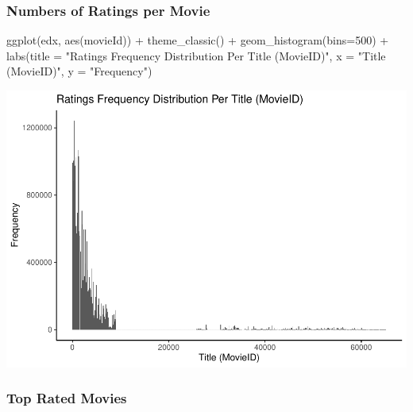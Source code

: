 \documentclass[
]{article}
\newenvironment{Shaded}{}{}
\newcommand{\AttributeTok}[1]{\textcolor[rgb]{0.49,0.56,0.16}{#1}}
\newcommand{\DecValTok}[1]{\textcolor[rgb]{0.25,0.63,0.44}{#1}}
\newcommand{\FunctionTok}[1]{\textcolor[rgb]{0.02,0.16,0.49}{#1}}
\newcommand{\NormalTok}[1]{#1}
\newcommand{\SpecialCharTok}[1]{\textcolor[rgb]{0.25,0.44,0.63}{#1}}
\newcommand{\StringTok}[1]{\textcolor[rgb]{0.25,0.44,0.63}{#1}}
\begin{document}
\hypertarget{numbers-of-ratings-per-movie}{%
\subsubsection{Numbers of Ratings per
Movie}\label{numbers-of-ratings-per-movie}}

\begin{Shaded}
\begin{Highlighting}[]
   \FunctionTok{ggplot}\NormalTok{(edx, }\FunctionTok{aes}\NormalTok{(movieId)) }\SpecialCharTok{+}
   \FunctionTok{theme\_classic}\NormalTok{()  }\SpecialCharTok{+}
   \FunctionTok{geom\_histogram}\NormalTok{(}\AttributeTok{bins=}\DecValTok{500}\NormalTok{) }\SpecialCharTok{+}
   \FunctionTok{labs}\NormalTok{(}\AttributeTok{title =} \StringTok{"Ratings Frequency Distribution Per Title (MovieID)"}\NormalTok{,}
        \AttributeTok{x =} \StringTok{"Title (MovieID)"}\NormalTok{,}
        \AttributeTok{y =} \StringTok{"Frequency"}\NormalTok{)}
\end{Highlighting}
\end{Shaded}

\begin{center}\includegraphics{MovieLens-Project-Code_files/figure-latex/unnamed-chunk-22-1} \end{center}

\hypertarget{top-rated-movies}{%
\subsubsection{Top Rated Movies}\label{top-rated-movies}}
\end{document}
